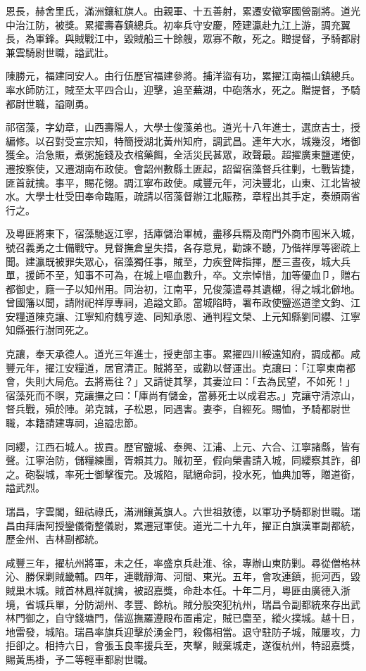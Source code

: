 \begin{pinyinscope}
恩長，赫舍里氏，滿洲鑲紅旗人。由親軍、十五善射，累遷安徽寧國營副將。道光中治江防，被獎。累擢壽春鎮總兵。初率兵守安慶，陸建瀛赴九江上游，調充翼長，為軍鋒。與賊戰江中，毀賊船三十餘艘，眾寡不敵，死之。贈提督，予騎都尉兼雲騎尉世職，謚武壯。

陳勝元，福建同安人。由行伍歷官福建參將。捕洋盜有功，累擢江南福山鎮總兵。率水師防江，賊至太平四合山，迎擊，追至蕪湖，中砲落水，死之。贈提督，予騎都尉世職，謚剛勇。

祁宿藻，字幼章，山西壽陽人，大學士俊藻弟也。道光十八年進士，選庶吉士，授編修。以召對受宣宗知，特簡授湖北黃州知府，調武昌。連年大水，城幾沒，堵御獲全。治急賑，煮粥施錢及衣棺藥餌，全活災民甚眾，政聲最。超擢廣東鹽運使，遷按察使，又遷湖南布政使。會韶州數縣土匪起，詔留宿藻督兵往剿，七戰皆捷，匪首就擒。事平，賜花翎。調江寧布政使。咸豐元年，河決豐北，山東、江北皆被水。大學士杜受田奉命臨賑，疏請以宿藻督辦江北賑務，章程出其手定，奏頒兩省行之。

及粵匪將東下，宿藻馳返江寧，括庫儲治軍械，盡移兵糈及南門外商市囤米入城，號召義勇之士備戰守。見督撫倉皇失措，各存意見，勸諫不聽，乃偕祥厚等密疏上聞。建瀛既被罪失眾心，宿藻獨任事，賊至，力疾登陴指揮，歷三晝夜，城大兵單，援師不至，知事不可為，在城上嘔血數升，卒。文宗悼惜，加等優血⼙，贈右都御史，廕一子以知州用。同治初，江南平，兄俊藻遣尋其遺櫬，得之城北僻地。曾國籓以聞，請附祀祥厚專祠，追謚文節。當城陷時，署布政使鹽巡道塗文鈞、江安糧道陳克讓、江寧知府魏亨逵、同知承恩、通判程文榮、上元知縣劉同纓、江寧知縣張行澍同死之。

克讓，奉天承德人。道光三年進士，授吏部主事。累擢四川綏遠知府，調成都。咸豐元年，擢江安糧道，居官清正。賊將至，或勸以督運出。克讓曰：「江寧東南都會，失則大局危。去將焉往？」又請徙其孥，其妻泣曰：「去為民望，不如死！」宿藻死而不瞑，克讓撫之曰：「庫尚有儲金，當募死士以成君志。」克讓守清涼山，督兵戰，殞於陣。弟克誠，子松恩，同遇害。妻李，自經死。賜恤，予騎都尉世職，本籍請建專祠，追謚忠節。

同纓，江西石城人。拔貢。歷官鹽城、泰興、江浦、上元、六合、江寧諸縣，皆有聲。江寧治防，儲糧練團，胥賴其力。賊初至，假向榮書請入城，同纓察其詐，卻之。砲裂城，率死士御擊復完。及城陷，賦絕命詞，投水死，恤典加等，贈道銜，謚武烈。

瑞昌，字雲閣，鈕祜祿氏，滿洲鑲黃旗人。六世祖敖德，以軍功予騎都尉世職。瑞昌由拜唐阿授鑾儀衛整儀尉，累遷冠軍使。道光二十九年，擢正白旗漢軍副都統，歷金州、吉林副都統。

咸豐三年，擢杭州將軍，未之任，率盛京兵赴淮、徐，專辦山東防剿。尋從僧格林沁、勝保剿賊畿輔。四年，連戰靜海、河間、東光。五年，會攻連鎮，扼河西，毀賊巢木城。賊首林鳳祥就擒，被詔嘉獎，命赴本任。十年二月，粵匪由廣德入浙境，省城兵單，分防湖州、孝豐、餘杭。賊分股突犯杭州，瑞昌令副都統來存出武林門御之，自守錢塘門，偕巡撫羅遵殿布置甫定，賊已麕至，縱火撲城。越十日，地雷發，城陷。瑞昌率旗兵迎擊於湧金門，殺傷相當。退守駐防子城，賊屢攻，力拒卻之。相持六日，會張玉良率援兵至，夾擊，賊棄城走，遂復杭州，特詔嘉獎，賜黃馬褂，予二等輕車都尉世職。


\end{pinyinscope}
